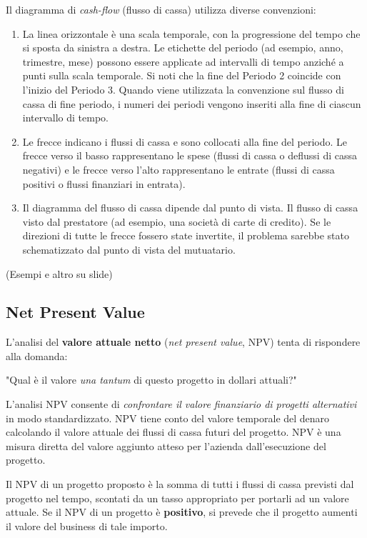 \documentclass[a4paper,portrait,12pt]{article}
\theoremstyle{definition}
\begin{document}
Il diagramma di \emph{cash-flow} (flusso di cassa) utilizza diverse convenzioni:
\begin{enumerate}
\item La linea orizzontale è una scala temporale, con la progressione del tempo che si sposta da sinistra a destra. Le etichette del periodo (ad esempio, anno, trimestre, mese) possono essere applicate ad intervalli di tempo anziché a punti sulla scala temporale.
Si noti che la fine del Periodo 2 coincide con l'inizio del Periodo 3.
Quando viene utilizzata la convenzione sul flusso di cassa di fine periodo, i numeri dei periodi vengono inseriti alla fine di ciascun intervallo di tempo.

\item Le frecce indicano i flussi di cassa e sono collocati alla fine del periodo.
Le frecce verso il basso rappresentano le spese (flussi di cassa o deflussi di cassa negativi) e le frecce verso l'alto rappresentano le entrate (flussi di cassa positivi o flussi finanziari in entrata).

\item Il diagramma del flusso di cassa dipende dal punto di vista.
Il flusso di cassa visto dal prestatore (ad esempio, una società di carte di credito).
Se le direzioni di tutte le frecce fossero state invertite, il problema sarebbe stato schematizzato dal punto di vista del mutuatario.
\end{enumerate}

(Esempi e altro su slide)


\subsection{Net Present Value}

L'analisi del \textbf{valore attuale netto} (\emph{net present value}, NPV) tenta di rispondere alla domanda:
\begin{center}
"Qual è il valore \emph{una tantum} di questo progetto in dollari attuali?"
\end{center}
L'analisi NPV consente di \emph{confrontare il valore finanziario di progetti alternativi} in modo standardizzato.
NPV tiene conto del valore temporale del denaro calcolando il valore attuale dei flussi di cassa futuri del progetto.
NPV è una misura diretta del valore aggiunto atteso per l'azienda dall'esecuzione del progetto.

Il NPV di un progetto proposto è la somma di tutti i flussi di cassa previsti dal progetto nel tempo, scontati da un tasso appropriato per portarli ad un valore attuale.
Se il NPV di un progetto è \textbf{positivo}, si prevede che il progetto aumenti il valore del business di tale importo.\\
\end{document}
